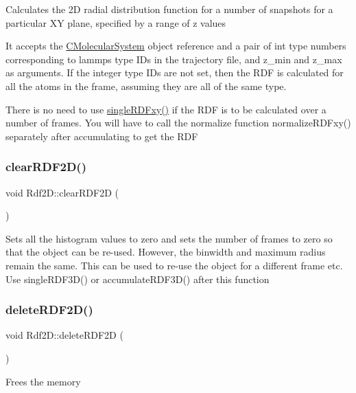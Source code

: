 Calculates the 2D radial distribution function for a number of snapshots for a particular XY plane, specified by a range of z values

It accepts the \mbox{\hyperlink{classCMolecularSystem}{C\+Molecular\+System}} object reference and a pair of int type numbers corresponding to lammps type I\+Ds in the trajectory file, and z\+\_\+min and z\+\_\+max as arguments. If the integer type I\+Ds are not set, then the R\+DF is calculated for all the atoms in the frame, assuming they are all of the same type.

There is no need to use \mbox{\hyperlink{classRdf2D_afc5ff73aa9c126184e94ee3abfc14ff4}{single\+R\+D\+Fxy()}} if the R\+DF is to be calculated over a number of frames. You will have to call the normalize function normalize\+R\+D\+Fxy() separately after accumulating to get the R\+DF \mbox{\label{classRdf2D_a9658a9bb2229afda0d743bdc05a27411}} 
\subsubsection{\texorpdfstring{clear\+R\+D\+F2\+D()}{clearRDF2D()}}
{\footnotesize\ttfamily void Rdf2\+D\+::clear\+R\+D\+F2D (\begin{DoxyParamCaption}{ }\end{DoxyParamCaption})}

Sets all the histogram values to zero and sets the number of frames to zero so that the object can be re-\/used. However, the binwidth and maximum radius remain the same. This can be used to re-\/use the object for a different frame etc. Use single\+R\+D\+F3\+D() or accumulate\+R\+D\+F3\+D() after this function \mbox{\label{classRdf2D_a8008421c8aedff5887160b455879d36b}} 
\subsubsection{\texorpdfstring{delete\+R\+D\+F2\+D()}{deleteRDF2D()}}
{\footnotesize\ttfamily void Rdf2\+D\+::delete\+R\+D\+F2D (\begin{DoxyParamCaption}{ }\end{DoxyParamCaption})}

Frees the memory \mbox{\label{classRdf2D_a3c8153b303733b7e5d320f9b20f37b32}} 
